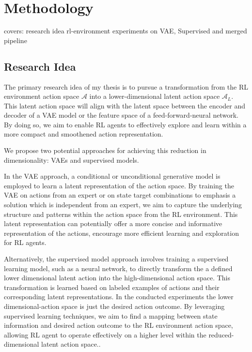 \chapter{Methodology}\label{chap:Methodology}

covers:
research idea
rl-environment
experiments on VAE, Supervised and merged pipeline

\section{Research Idea}

The primary research idea of my thesis is to pursue a transformation from the RL environment action space $\mathcal{A}$ into a lower-dimensional latent action space $\mathcal{A}_L$. This latent action space will align with the latent space between the encoder and decoder of a VAE model or the feature space of a feed-forward-neural network. By doing so, we aim to enable RL agents to effectively explore and learn within a more compact and smoothened action representation.

We propose two potential approaches for achieving this reduction in dimensionality: VAEs and supervised models.

In the VAE approach, a conditional or unconditional generative model is employed to learn a latent representation of the action space. By training the VAE on actions from an expert or on state target combinations to emphasis a solution which is independent from an expert, we aim to capture the underlying structure and patterns within the action space from the RL environment. This latent representation can potentially offer a more concise and informative representation of the actions, encourage more efficient learning and exploration for RL agents.

Alternatively, the supervised model approach involves training a supervised learning model, such as a neural network, to directly transform the a defined lower dimensional latent action into the high-dimensional action space. This transformation is learned based on labeled examples of actions and their corresponding latent representations. In the conducted experiments the lower dimensional-action space is just the desired action outcome. By leveraging supervised learning techniques, we aim to find a mapping between state information and desired action outcome to the RL environment action space, allowing RL agent to operate effectively on a higher level within the reduced-dimensional latent action space..


